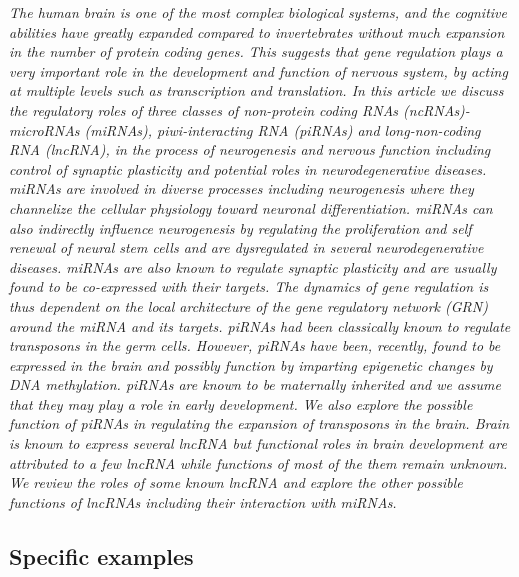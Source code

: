 \documentclass[graybox]{svmult}
\begin{document}
\cite{Iyengar2014}
\textit{The human brain is one of the most complex biological systems, and the 
cognitive abilities have greatly expanded compared to invertebrates without much 
expansion in the number of protein coding genes. This suggests that gene 
regulation plays a very important role in the development and function of 
nervous system, by acting at multiple levels such as transcription and 
translation. In this article we discuss the regulatory roles of three classes of 
non-protein coding RNAs (ncRNAs)-microRNAs (miRNAs), piwi-interacting RNA 
(piRNAs) and long-non-coding RNA (lncRNA), in the process of neurogenesis and 
nervous function including control of synaptic plasticity and potential roles in 
neurodegenerative diseases. miRNAs are involved in diverse processes including 
neurogenesis where they channelize the cellular physiology toward neuronal 
differentiation. miRNAs can also indirectly influence neurogenesis by regulating 
the proliferation and self renewal of neural stem cells and are dysregulated in 
several neurodegenerative diseases. miRNAs are also known to regulate synaptic 
plasticity and are usually found to be co-expressed with their targets. The 
dynamics of gene regulation is thus dependent on the local architecture of the 
gene regulatory network (GRN) around the miRNA and its targets. piRNAs had been 
classically known to regulate transposons in the germ cells. However, piRNAs 
have been, recently, found to be expressed in the brain and possibly function by 
imparting epigenetic changes by DNA methylation. piRNAs are known to be 
maternally inherited and we assume that they may play a role in early 
development. We also explore the possible function of piRNAs in regulating the 
expansion of transposons in the brain. Brain is known to express several lncRNA 
but functional roles in brain development are attributed to a few lncRNA while 
functions of most of the them remain unknown. We review the roles of some known 
lncRNA and explore the other possible functions of lncRNAs including their 
interaction with miRNAs.}

\subsection{Specific examples} 
\end{document}
